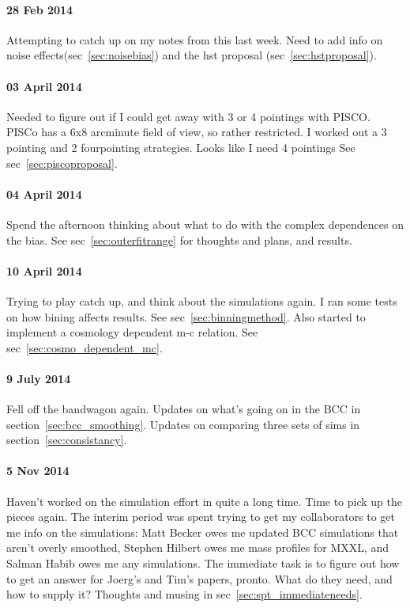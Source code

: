\documentclass[11pt]{article}
\begin{document}
\paragraph{28 Feb 2014}
Attempting to catch up on my notes from this last week. Need to add info on noise effects(sec~\ref{sec:noisebias}) and the hst proposal (sec~\ref{sec:hstproposal}).


\paragraph{03 April 2014}
Needed to figure out if I could get away with 3 or 4 pointings with PISCO. PISCo has a 6x8 arcminute field of view, so rather restricted. I worked out a 3 pointing and 2 fourpointing strategies. Looks like I need 4 pointings See sec~\ref{sec:piscoproposal}.

\paragraph{04 April 2014}
Spend the afternoon thinking about what to do with the complex dependences on the bias. See sec~\ref{sec:outerfitrange} for thoughts and plans, and results.

\paragraph{10 April 2014}
Trying to play catch up, and think about the simulations again. I ran some tests on how bining affects results. See sec~\ref{sec:binningmethod}.
Also started to implement a cosmology dependent m-c relation. See sec~\ref{sec:cosmo_dependent_mc}.

\paragraph{9 July 2014}
Fell off the bandwagon again. Updates on what's going on in the BCC in section~\ref{sec:bcc_smoothing}.
Updates on comparing three sets of sims in section~\ref{sec:consistancy}.

\paragraph{5 Nov 2014}
Haven't worked on the simulation effort in quite a long time. Time to pick up the pieces again. The interim period was spent trying to get my collaborators to get me info on the simulations: Matt Becker owes me updated BCC simulations that aren't overly smoothed, Stephen Hilbert owes me mass profiles for MXXL, and Salman Habib owes me any simulations. The immediate task is to figure out how to get an answer for Joerg's and Tim's papers, pronto. What do they need, and how to supply it? Thoughts and musing in sec~\ref{sec:spt_immediateneeds}.
\end{document}
